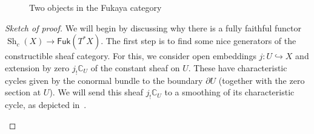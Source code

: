 \documentclass{amsart}
\theoremstyle{definition}
\theoremstyle{remark}
\theoremstyle{plain}
\theoremstyle{definition}
\theoremstyle{remark}
\newcommand{\C}{\mathbb{C}}
\renewcommand{\b}{\mathfrak{b}}
\newcommand{\on}[1]{\operatorname{#1}}
\newcommand{\ms}[1]{\mathsf{#1}}
\newcommand{\1}{\mathbf{1}}
\newcommand{\2}{\mathbf{2}}
\newcommand{\3}{\mathbf{3}}
\begin{document}
\begin{figure}[htpb]
\begin{center}
\end{center}
\caption{Two objects in the Fukaya category}%
\label{fig:fukaya}
\end{figure}


\begin{proof}[Sketch of proof]
    We will begin by discussing why there is a fully faithful functor \(\on{Sh}_c(X) \to \ms{Fuk}(T^* X)\). The first step is to find some nice generators of the constructible sheaf category. For this, we consider open embeddings \(j \colon U \hookrightarrow X\) and extension by zero \(j_! \C_U\) of the constant sheaf on \(U\). These have characteristic cycles given by the conormal bundle to the boundary \(\partial U\) (together with the zero section at \(U\)). We will send this sheaf \(j_! \C_U\) to a smoothing of its characteristic cycle, as depicted in~.
    \begin{figure}[htpb]
    \begin{center}
\end{center}
\end{figure}
\end{proof}
\end{document}
